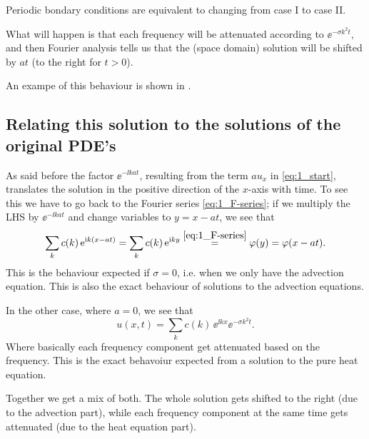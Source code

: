 \documentclass[11pt,letter, swedish, english
]{article}
\begin{document}
Periodic bondary conditions are equivalent to changing from case I to
case II. 

What will happen is that each frequency will be attenuated according
to $\ee^{-\sigma k^2t}$, and then Fourier analysis tells us that the
(space domain) solution will be shifted\footnotemark{} by $at$ (to
the right for $t>0$). 


An exampe of this behaviour is shown in .

\subsection{Relating this solution to the solutions of the original PDE's}
As said before the factor $\ee^{-\ii kat}$, resulting from the term
$au_x$ in \eqref{eq:1_start}, translates the solution in the positive
direction of the $x$-axis with time. To see this we have to go back to
the Fourier series \eqref{eq:1_F-series}; if we multiply the LHS by
$\ee^{-\ii kat}$ and change variables to $y=x-at$, we see that
\begin{equation}
\sum_k c(k)\, \mathrm{e}^{\mathrm{i} k(x-at)}=\sum_k c(k)\, \mathrm{e}^{\mathrm{i} ky}
\stackrel{\eqref{eq:1_F-series}}{=}\varphi(y)=\varphi(x-at).
\end{equation}
This is the behaviour expected if $\sigma=0$, i.e. when we only have
the advection equation. This is also the exact behaviour of solutions
to the advection equations. 

In the other case, where $a=0$, we see that 
\begin{equation}
u(x, t) = \sum_k c(k)\, \ee^{\ii kx}\ee^{-\sigma k^2t}.
\end{equation}
Where basically each frequency component get attenuated based on the
frequency. This is the exact behavoiur expected from a solution to the
pure heat equation. 

Together we get a mix of both. The whole solution gets shifted to the
right (due to the advection part), while each frequency component at
the same time gets attenuated (due to the heat equation part). 
\end{document}
